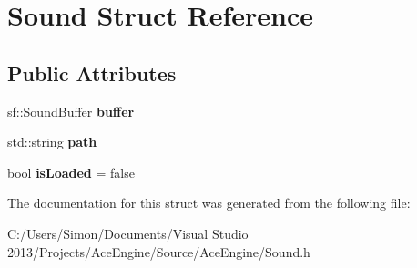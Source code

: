 \hypertarget{struct_sound}{}\section{Sound Struct Reference}
\label{struct_sound}
\subsection*{Public Attributes}
\begin{DoxyCompactItemize}
\item 
\hypertarget{struct_sound_a98783abfbc6344ce4160228714e53232}{}sf\+::\+Sound\+Buffer {\bfseries buffer}\label{struct_sound_a98783abfbc6344ce4160228714e53232}

\item 
\hypertarget{struct_sound_a87fb9425d23babf50354d587f4fc0417}{}std\+::string {\bfseries path}\label{struct_sound_a87fb9425d23babf50354d587f4fc0417}

\item 
\hypertarget{struct_sound_aa72b89f2aa57aa33794e7d6653a7f993}{}bool {\bfseries is\+Loaded} = false\label{struct_sound_aa72b89f2aa57aa33794e7d6653a7f993}

\end{DoxyCompactItemize}


The documentation for this struct was generated from the following file\+:\begin{DoxyCompactItemize}
\item 
C\+:/\+Users/\+Simon/\+Documents/\+Visual Studio 2013/\+Projects/\+Ace\+Engine/\+Source/\+Ace\+Engine/Sound.\+h\end{DoxyCompactItemize}
